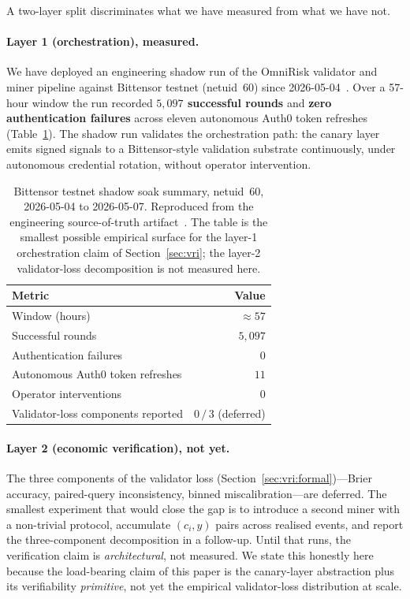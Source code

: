 \documentclass[journal]{IEEEtran}
\begin{document}
A two-layer split discriminates what we have measured from what we
have not.

\paragraph*{Layer 1 (orchestration), measured.}
We have deployed an engineering shadow run of the OmniRisk validator
and miner pipeline against Bittensor testnet (netuid~60) since
2026-05-04~\cite{omnirisk2026soak}. Over a 57-hour window the run recorded \textbf{$5{,}097$ successful
rounds} and \textbf{zero authentication failures} across eleven
autonomous Auth0 token refreshes (Table~\ref{tab:soak-telemetry}). The
shadow run validates the orchestration path: the canary layer emits
signed signals to a Bittensor-style validation substrate continuously,
under autonomous credential rotation, without operator intervention.

\begin{table}[ht]
\centering
\small
\caption{Bittensor testnet shadow soak summary, netuid~60, 2026-05-04
to 2026-05-07. Reproduced from the engineering source-of-truth
artifact~\cite{omnirisk2026soak}. The table is the smallest possible
empirical surface for the layer-1 orchestration claim of
Section~\ref{sec:vri}; the layer-2 validator-loss decomposition is not
measured here.}
\label{tab:soak-telemetry}
\renewcommand{\arraystretch}{1.15}
\begin{tabular}{@{}lr@{}}
\toprule
\textbf{Metric} & \textbf{Value} \\
\midrule
Window (hours) & $\approx 57$ \\
Successful rounds & $5{,}097$ \\
Authentication failures & $0$ \\
Autonomous Auth0 token refreshes & $11$ \\
Operator interventions & $0$ \\
Validator-loss components reported & $0\,/\,3$ (deferred) \\
\bottomrule
\end{tabular}
\end{table}

\paragraph*{Layer 2 (economic verification), not yet.}
The three components of the validator loss
(Section~\ref{sec:vri:formal})---Brier accuracy, paired-query
inconsistency, binned miscalibration---are deferred. The smallest
experiment that would close the gap is to introduce a second miner
with a non-trivial protocol, accumulate $(c_i,y)$ pairs across
realised events, and report the three-component decomposition in a
follow-up. Until that runs, the verification claim is
\emph{architectural}, not measured. We state this honestly here because
the load-bearing claim of this paper is the canary-layer abstraction
plus its verifiability \emph{primitive}, not yet the empirical
validator-loss distribution at scale.
\end{document}
